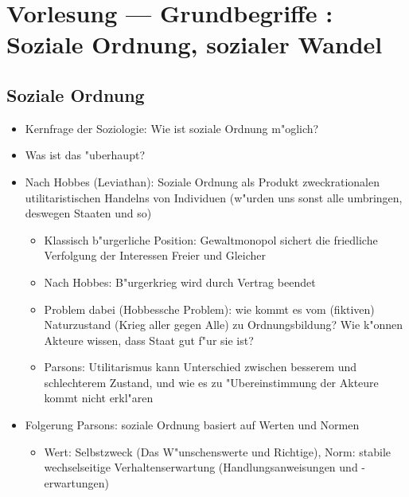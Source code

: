 \section{Vorlesung  --- Grundbegriffe : Soziale Ordnung, sozialer Wandel}
\subsection{Soziale Ordnung}
\begin{itemize}
	\item
		Kernfrage der Soziologie: Wie ist soziale Ordnung m"oglich?
	\item
		Was ist das "uberhaupt?
	\item
		Nach Hobbes (Leviathan): Soziale Ordnung als Produkt zweckrationalen utilitaristischen Handelns von Individuen (w"urden uns sonst alle umbringen, deswegen Staaten und so)
		\begin{itemize}
			\item
				Klassisch b"urgerliche Position: Gewaltmonopol sichert die friedliche Verfolgung der Interessen Freier und Gleicher
			\item
				Nach Hobbes: B"urgerkrieg wird durch Vertrag beendet
			\item
				Problem dabei (Hobbessche Problem): wie kommt es vom (fiktiven) Naturzustand (Krieg aller gegen Alle) zu Ordnungsbildung? Wie k"onnen Akteure wissen, dass Staat gut f"ur sie ist?
			\item
				Parsons: Utilitarismus kann Unterschied zwischen besserem und schlechterem Zustand, und wie es zu "Ubereinstimmung der Akteure kommt nicht erkl"aren
		\end{itemize}
	\item
		Folgerung Parsons: soziale Ordnung basiert auf Werten und Normen
		\begin{itemize}
			\item
				Wert: Selbstzweck (Das W"unschenswerte und Richtige), Norm: stabile wechselseitige Verhaltenserwartung (Handlungsanweisungen und -erwartungen)


\end{itemize}
\end{itemize}
